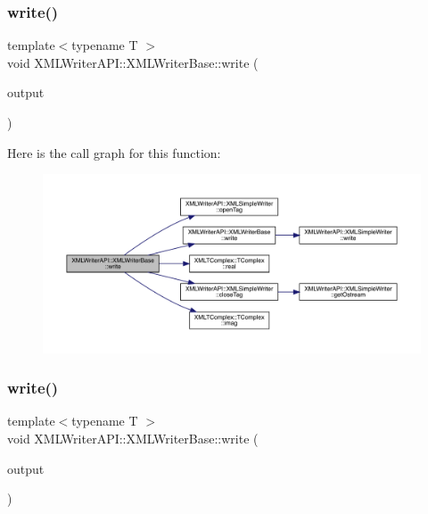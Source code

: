 \subsubsection{\texorpdfstring{write()}{write()}\hspace{0.1cm}{\footnotesize\ttfamily [32/39]}}
{\footnotesize\ttfamily template$<$typename T $>$ \\
void X\+M\+L\+Writer\+A\+P\+I\+::\+X\+M\+L\+Writer\+Base\+::write (\begin{DoxyParamCaption}\item[{\mbox{\hyperlink{classXMLTComplex_1_1TComplex}{T\+Complex}}$<$ T $>$ \&}]{output }\end{DoxyParamCaption})\hspace{0.3cm}{\ttfamily [inline]}}

Here is the call graph for this function\+:
\nopagebreak
\begin{figure}[H]
\begin{center}
\leavevmode
\includegraphics[width=350pt]{d5/df5/classXMLWriterAPI_1_1XMLWriterBase_a00b5edcaf39f8bdaf2aa5eed7118c8e7_cgraph}
\end{center}
\end{figure}
\mbox{\label{classXMLWriterAPI_1_1XMLWriterBase_a00b5edcaf39f8bdaf2aa5eed7118c8e7}} 
\subsubsection{\texorpdfstring{write()}{write()}\hspace{0.1cm}{\footnotesize\ttfamily [33/39]}}
{\footnotesize\ttfamily template$<$typename T $>$ \\
void X\+M\+L\+Writer\+A\+P\+I\+::\+X\+M\+L\+Writer\+Base\+::write (\begin{DoxyParamCaption}\item[{\mbox{\hyperlink{classXMLTComplex_1_1TComplex}{T\+Complex}}$<$ T $>$ \&}]{output }\end{DoxyParamCaption})\hspace{0.3cm}{\ttfamily [inline]}}

